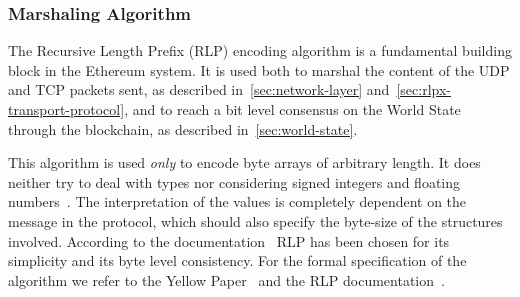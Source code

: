 \subsubsection{Marshaling Algorithm}
\label{sec:marshaling}
The Recursive Length Prefix (RLP) encoding algorithm is a fundamental building
block in the Ethereum system.
It is used both to marshal the content
of the UDP and TCP packets sent, as described in~\autoref{sec:network-layer}
and~\autoref{sec:rlpx-transport-protocol}, and to reach a bit level consensus on
the World State through the blockchain, as described
in~\autoref{sec:world-state}.


This algorithm is used \emph{only} to encode byte arrays of arbitrary length.
It does neither try to deal with types nor considering signed integers and
floating numbers~\cite{wood2018ethereum}. The interpretation of the values
is completely dependent on the message in the protocol, which should
also specify the byte-size of the structures involved.
According to the documentation~\cite{bib:design-rationale} RLP has been chosen
for its simplicity and its byte level consistency.
For the formal specification of the algorithm we refer
to the Yellow Paper~\cite[Appendix B]{wood2018ethereum} and the RLP
documentation~\cite{bib:ethereumrlpspec}.
